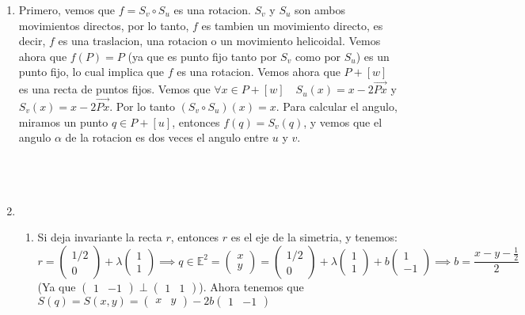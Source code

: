\documentclass{article}
\newcommand{\vv}[1]{\overrightarrow{#1}}
\begin{document}
\begin{enumerate}[label=(\Alph*)]
\item Primero, vemos que $f = S_v \circ S_u$ es una rotacion. $S_v$ y $S_u$ son ambos movimientos
directos, por lo tanto, $f$ es tambien un movimiento directo, es decir, $f$ es una traslacion, una rotacion
o un movimiento helicoidal. Vemos ahora que $f(P) = P$ (ya que es punto fijo tanto por $S_v$ como por
$S_u$) es un punto fijo, lo cual implica que $f$ es una rotacion. Vemos ahora que $P + [w]$ es una
recta de puntos fijos. Vemos que $\forall x \in P +[w] \quad S_u(x) = x - 2\vv{Px}$ y
$S_v(x) = x - 2\vv{Px}$. Por lo tanto $(S_v \circ S_u)(x) = x$. Para calcular el angulo, miramos un punto
$q \in P + [u]$, entonces $f(q) = S_v(q)$, y vemos que el angulo $\alpha$ de la rotacion es dos veces
el angulo entre $u$ y $v$.
\\ \\ \\ \\
\item \begin{enumerate}[label=\roman*)]
\item Si deja invariante la recta $r$, entonces $r$ es el eje de la simetria, y tenemos:
\[
r = \begin{pmatrix} 1/2 \\ 0 \end{pmatrix} + \lambda \begin{pmatrix} 1 \\ 1 \end{pmatrix}
\implies
q \in \mathbb{E}^2 = \begin{pmatrix} x \\ y \end{pmatrix} =
\begin{pmatrix} 1/2 \\0 \end{pmatrix} + \lambda \begin{pmatrix} 1 \\1 \end{pmatrix} + 
b \begin{pmatrix} 1 \\ -1 \end{pmatrix}
\implies
b = \frac{x-y-\frac{1}{2}}{2}
\]
(Ya que $\begin{pmatrix} 1 & -1\end{pmatrix} \perp \begin{pmatrix} 1 & 1\end{pmatrix}$). Ahora tenemos
que $S(q) = S(x,y) = \begin{pmatrix} x & y \end{pmatrix} - 2b\begin{pmatrix} 1 & -1 \end{pmatrix}$

\end{enumerate}
\end{enumerate}
\end{document}
